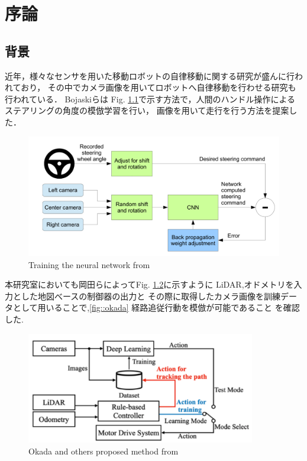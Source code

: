 \chapter{序論}
\section{背景}
近年，様々なセンサを用いた移動ロボットの自律移動に関する研究が盛んに行われており，
その中でカメラ画像を用いてロボットへ自律移動を行わせる研究も行われている．
Bojaskiら\cite{Nvidia}は
Fig. \ref{fig::nvidia}で示す方法で，人間のハンドル操作によるステアリングの角度の模倣学習を行い，
画像を用いて走行を行う方法を提案した．

\begin{figure}[h]
    \centering
    \includegraphics[width = 13cm]{./figs/EndtoEnd_Learning_for_Self-Driving_Cars.pdf}
    \caption{Training the neural network from \cite{Nvidia}}
    \label{fig::nvidia}
\end{figure}

\newpage
本研究室においても岡田ら\cite{okada}によってFig. \ref{fig::okada_sys}に示すように
LiDAR,オドメトリを入力とした地図べースの制御器の出力と
その際に取得したカメラ画像を訓練データとして用いることで,\ref{fig::okada}
経路追従行動を模倣が可能であること
を確認した.
\begin{figure}[h]
    \centering
    \includegraphics[width = 10cm]{./figs/okada_sys.png}
    \caption{Okada and others proposed method from \cite{okada}}
    \label{fig::okada_sys}
\end{figure}

